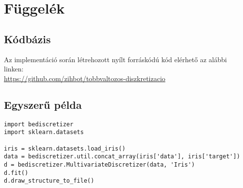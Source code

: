 \appendix \label{chapter:függelék}
\chapter*{Függelék}
\setcounter{chapter}{6}  %
\setcounter{equation}{0} %




\section{Kódbázis} \label{appendix:codebase}
Az implementáció során létrehozott nyílt forráskódú kód elérhető az alábbi linken: \\ \url{https://github.com/zihbot/tobbvaltozos-diszkretizacio}

\section{Egyszerű példa} \label{appendix:simpleexample}
\begin{lstlisting}
import bediscretizer
import sklearn.datasets

iris = sklearn.datasets.load_iris()
data = bediscretizer.util.concat_array(iris['data'], iris['target'])
d = bediscretizer.MultivariateDiscretizer(data, 'Iris')
d.fit()
d.draw_structure_to_file()
\end{lstlisting}